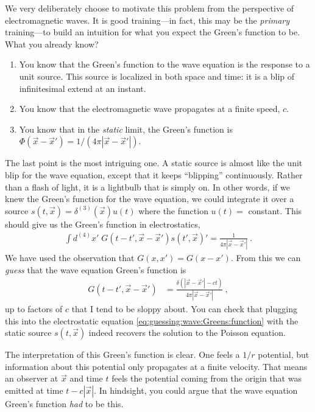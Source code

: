 We very deliberately choose to motivate this problem from the perspective of electromagnetic waves. It is good training---in fact, this may be the \emph{primary} training---to build an intuition for what you expect the Green's function to be. What you already know?
\begin{enumerate}
  \item You know that the Green's function to the wave equation is the response to a unit source. This source is localized in both space and time: it is a blip of infinitesimal extend at an instant. 
  \item You know that the electromagnetic wave propagates at a finite speed, $c$. 
  \item You know that in the \emph{static} limit, the Green's function is $\Phi(\vec{x}-\vec{x}')= 1/(4\pi |\vec{x}-\vec{x}'|)$. 
\end{enumerate}
The last point is the most intriguing one. A static source is almost like the unit blip for the wave equation, except that it keeps ``blipping'' continuously. Rather than a flash of light, it is a lightbulb that is simply on. In other words, if we knew the Green's function for the wave equation, we could integrate it over a source $s(t,\vec{x}) = \delta^{(3)}(\vec{x}) u(t)$ where the function $u(t) =$ constant. This should give us the Green's function in electrostatics,
\begin{align}
  \int d^{(4)}x'\; G(t-t',\vec{x}-\vec{x}') s(t', \vec{x})' = \frac{1}{4\pi |\vec{x}-\vec{x}'|} \ . 
  \label{eq:guessing:wave:Greens:function}
\end{align}
We have used the observation that $G(x,x') = G(x-x')$. 
From this we can \emph{guess} that the wave equation Green's function is
\begin{align}
  G(t-t',\vec{x}-\vec{x}') &= 
  \frac{\delta(|\vec{x}-\vec{x}'|-ct)}{4\pi |\vec{x}-\vec{x}'|} \ ,
\end{align}
up to factors of $c$ that I tend to be sloppy about. You can check that plugging this into the electrostatic equation \eqref{eq:guessing:wave:Greens:function} with the static source $s(t,\vec{x})$ indeed recovers the solution to the Poisson equation. 

The interpretation of this Green's function is clear. One feels a $1/r$ potential, but information about this potential only propagates at a finite velocity. That means an observer at $\vec{x}$ and time $t$ feels the potential coming from the origin that was emitted at time $t-c|\vec{x}|$. In hindsight, you could argue that the wave equation Green's function \emph{had} to be this.  


